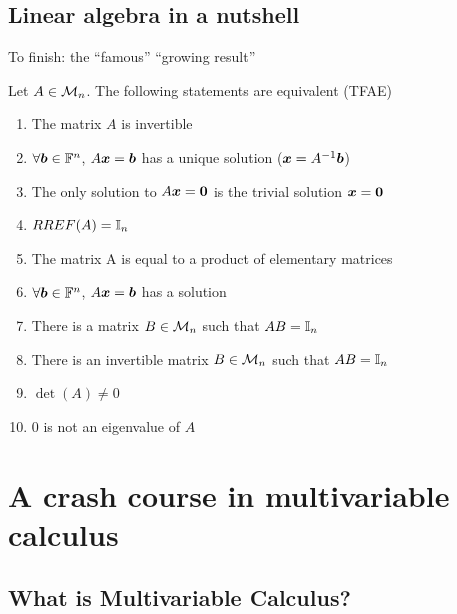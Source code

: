 \documentclass[aspectratio=169]{beamer}\usepackage[]{graphicx}\usepackage[]{xcolor}
\begin{document}
\subsection{Linear algebra in a nutshell}


\begin{frame}{To finish: the ``famous'' ``growing result''}
\begin{importanttheorem}
Let $A\in\mathcal{M}_n$. The following statements are equivalent (TFAE)
\begin{enumerate}
\item The matrix $A$ is invertible
\item $\forall\bm{b}\in\mathbb{F}^n$, $A\bm{x} = \bm{b}$ has a unique solution ($\bm{x}=A^{-1}\bm{b}$)
\item The only solution to $A\bx = \b0$ is the trivial solution $\bx = \b0$
\item $RREF(A)=\mathbb{I}_n$
\item The matrix A is equal to a product of elementary matrices
\item $\forall\bm{b}\in\mathbb{F}^n$, $A\bm{x} = \bm{b}$ has a solution
\item There is a matrix $B\in\mathcal{M}_n$ such that $AB = \mathbb{I}_n$
\item There is an invertible matrix $B\in\mathcal{M}_n$ such that $AB = \mathbb{I}_n$
\item $\det(A)\neq 0$
\item $0$ is not an eigenvalue of $A$
\end{enumerate}
\end{importanttheorem}
\end{frame}



\section{A crash course in multivariable calculus}


\subsection{What is Multivariable Calculus?}
\end{document}
